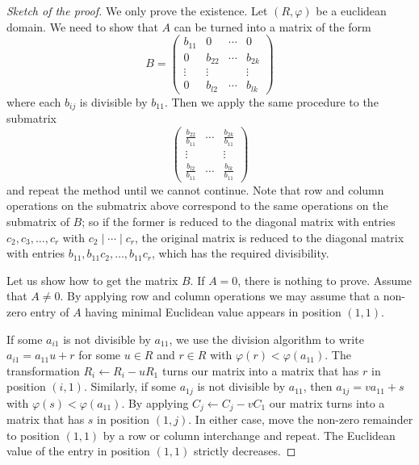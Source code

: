 \begin{proof}[Sketch of the proof]
	We only prove the existence. Let $(R,\varphi)$ be a euclidean domain.  
	We need to show that $A$ can be turned into a matrix of the form 
\begin{equation*}
B=\begin{pmatrix}
	b_{11} & 0 & \cdots & 0\\
	0 & b_{22} & \cdots & b_{2k}\\
	\vdots & \vdots &&  \vdots\\
	0 & b_{l2} & \cdots & b_{lk}
\end{pmatrix}
\end{equation*}
where each  $b_{ij}$ is divisible by $b_{11}$. Then we apply the same procedure
to the submatrix 
\[
\begin{pmatrix}
	\frac{b_{22}}{b_{11}} & \cdots & \frac{b_{2k}}{b_{11}}\\
	\vdots & &\vdots \\
	\frac{b_{l2}}{b_{11}} & \cdots & \frac{b_{lk}}{b_{11}}
\end{pmatrix}
\]
and repeat the method until we cannot continue. Note that row and column
operations on the submatrix above correspond to the same operations on the
submatrix of $B$; so if the former is reduced to the diagonal matrix with
entries $c_2,c_3,\dots,c_r$ with $c_2\mid\cdots\mid c_r$, the original matrix
is reduced to the diagonal matrix with entries
$b_{11},b_{11}c_2,\dots,b_{11}c_r$, which has the required divisibility.

Let us show how to get the matrix $B$. If $A=0$, there is nothing to prove. 
Assume that $A\ne0$. By applying row and column operations we may assume that 
a non-zero entry of $A$ having minimal Euclidean value 
appears 
in position
$(1,1)$.  

If some $a_{i1}$ is not divisible by $a_{11}$, we use the division algorithm to write   
$a_{i1}=a_{11}u+r$ for some $u\in R$ and $r\in R$ with 
$\varphi(r)<\varphi(a_{11})$. The transformation 
$R_i\leftarrow R_i-uR_1$ turns our matrix into a matrix that 
has $r$ in position $(i,1)$. Similarly, if some $a_{1j}$
is not divisible by $a_{11}$, then $a_{1j}=va_{11}+s$ with $\varphi(s)<\varphi(a_{11})$. 
By applying  
$C_j\leftarrow C_j-vC_1$ our matrix turns into a matrix 
that has $s$ in position 
$(1,j)$.  
In either case, move the non-zero remainder to position $(1,1)$
by a row or column interchange and repeat. The Euclidean value of
the entry in position $(1,1)$ strictly decreases. 


\end{proof}
